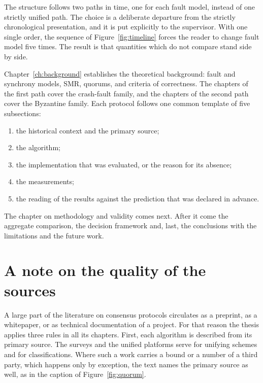 The structure follows two paths in time, one for each fault model,
instead of one strictly unified path. The choice is a deliberate
departure from the strictly chronological presentation, and it is put
explicitly to the supervisor. With one single order, the sequence of
Figure~\ref{fig:timeline} forces the reader to change fault model five
times. The result is that quantities which do not compare stand side by
side.

Chapter~\ref{ch:background} establishes the theoretical background: fault
and synchrony models, SMR, quorums, and criteria of correctness. The
chapters of the first path cover the crash-fault family, and the chapters
of the second path cover the Byzantine family. Each protocol follows one
common template of five subsections:

\begin{enumerate}[label=\arabic*.,leftmargin=2.4em]
  \item the historical context and the primary source;
  \item the algorithm;
  \item the implementation that was evaluated, or the reason for its
  absence;
  \item the measurements;
  \item the reading of the results against the prediction that was
  declared in advance.
\end{enumerate}

The chapter on methodology and validity comes next. After it come the
aggregate comparison, the decision framework and, last, the conclusions
with the limitations and the future work.

\section{A note on the quality of the sources}
\label{sec:sources}

A large part of the literature on consensus protocols circulates as a
preprint, as a whitepaper, or as technical documentation of a project.
For that reason the thesis applies three rules in all its chapters.
First, each algorithm is described from its primary source. The surveys
and the unified platforms serve for unifying schemes and for
classifications. Where such a work carries a bound or a number of a third
party, which happens only by exception, the text names the primary source
as well, as in the caption of Figure~\ref{fig:quorum}.


